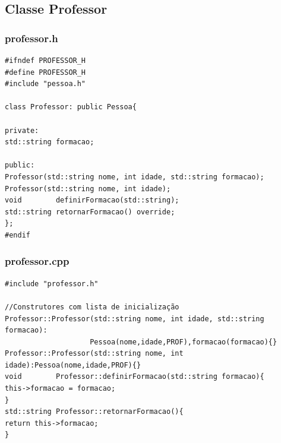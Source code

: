 \documentclass[12pt,a4paper]{article}
\begin{document}
\subsection*{Classe Professor}
\subsubsection*{professor.h}
\begin{verbatim}
#ifndef PROFESSOR_H
#define PROFESSOR_H
#include "pessoa.h"

class Professor: public Pessoa{

private:
std::string formacao;

public:
Professor(std::string nome, int idade, std::string formacao);
Professor(std::string nome, int idade);
void        definirFormacao(std::string);
std::string retornarFormacao() override;
};
#endif
\end{verbatim}

\subsubsection*{professor.cpp}

\begin{verbatim}
#include "professor.h"

//Construtores com lista de inicialização
Professor::Professor(std::string nome, int idade, std::string formacao):
                    Pessoa(nome,idade,PROF),formacao(formacao){}
Professor::Professor(std::string nome, int idade):Pessoa(nome,idade,PROF){}
void        Professor::definirFormacao(std::string formacao){
this->formacao = formacao;
}
std::string Professor::retornarFormacao(){
return this->formacao;
}
\end{verbatim}
\end{document}
